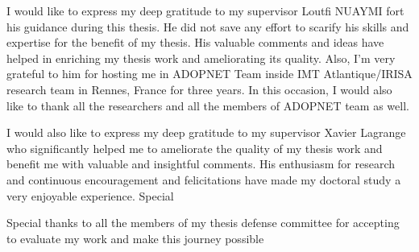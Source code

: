 
\begin{acknowledgements}      
I would like to express my deep gratitude to my supervisor Loutfi NUAYMI fort his guidance during this thesis. He did not save any effort to scarify his skills and expertise for the benefit of my thesis. His valuable comments and ideas have helped in enriching my thesis work and ameliorating its quality. Also, I'm very grateful to him for hosting me in ADOPNET Team inside IMT Atlantique/IRISA research team in Rennes, France for three years. In this occasion, I would also like to thank all the researchers and all the members of ADOPNET team as well.

 I would also like to express my deep gratitude to my supervisor Xavier Lagrange who significantly helped me to ameliorate the quality of my thesis work and benefit me with valuable and insightful comments. His enthusiasm for research and continuous encouragement and felicitations have made my doctoral study a very enjoyable experience. Special

Special thanks to all the members of my thesis defense committee for accepting to evaluate my work and make this journey possible
\end{acknowledgements}
